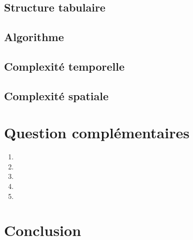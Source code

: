 \documentclass[a4paper, titlepage]{article}
\begin{document}
	\subsection{Structure tabulaire}
	\subsection{Algorithme}
	\subsection{Complexité temporelle}
	\subsection{Complexité spatiale}

\section{Question complémentaires}
\begin{enumerate}
\item
\item
\item
\item
\item
\end{enumerate}

\section{Conclusion}
\end{document}
